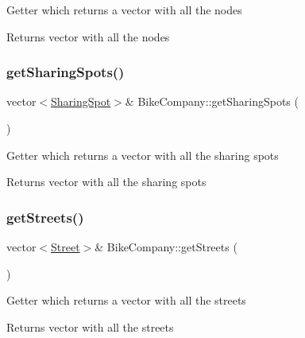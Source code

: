 Getter which returns a vector with all the nodes \begin{DoxyReturn}{Returns}
vector with all the nodes 
\end{DoxyReturn}
\mbox{\label{class_bike_company_ac361f971df61155a1763c682b28f6297}} 
\subsubsection{\texorpdfstring{get\+Sharing\+Spots()}{getSharingSpots()}}
{\footnotesize\ttfamily vector$<$\mbox{\hyperlink{class_sharing_spot}{Sharing\+Spot}}$>$\& Bike\+Company\+::get\+Sharing\+Spots (\begin{DoxyParamCaption}{ }\end{DoxyParamCaption})\hspace{0.3cm}{\ttfamily [inline]}}

Getter which returns a vector with all the sharing spots \begin{DoxyReturn}{Returns}
vector with all the sharing spots 
\end{DoxyReturn}
\mbox{\label{class_bike_company_a545b86c3c1dbde4b8f70871b4d23be2b}} 
\subsubsection{\texorpdfstring{get\+Streets()}{getStreets()}}
{\footnotesize\ttfamily vector$<$\mbox{\hyperlink{class_street}{Street}}$>$\& Bike\+Company\+::get\+Streets (\begin{DoxyParamCaption}{ }\end{DoxyParamCaption})\hspace{0.3cm}{\ttfamily [inline]}}

Getter which returns a vector with all the streets \begin{DoxyReturn}{Returns}
vector with all the streets 
\end{DoxyReturn}
\mbox{\label{class_bike_company_a19f8b3503630ec5f5c12ead35cdbe995}} 
